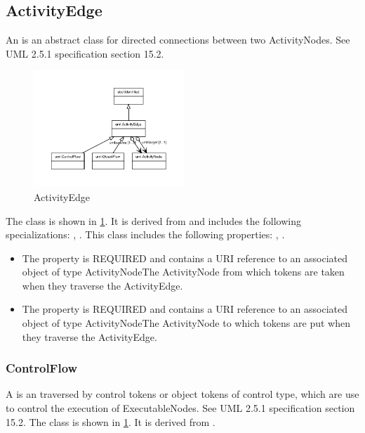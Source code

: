 \subsection{ActivityEdge}%
\label{sec:uml:ActivityEdge}%
An  is an abstract class for directed connections between two ActivityNodes. See UML 2.5.1 specification section 15.2.%
\newline%
\linebreak%


\begin{figure}[h!]%
\centering%
\includegraphics[width=0.5063829787234042\textwidth]{uml_classes/ActivityEdge_abstraction_hierarchy.pdf}%
\caption{ActivityEdge}%
\label{fig:ActivityEdge}%
\end{figure}

%
The  class is shown in \ref{fig:ActivityEdge}. It is derived from  and includes the following specializations: , . %
This class includes the following properties: , . %
\begin{itemize}%
\item%
The  property is REQUIRED and contains a URI reference to an associated object of type ActivityNodeThe ActivityNode from which tokens are taken when they traverse the ActivityEdge.%
\item%
The  property is REQUIRED and contains a URI reference to an associated object of type ActivityNodeThe ActivityNode to which tokens are put when they traverse the ActivityEdge.%
\end{itemize}%
\subsubsection{ControlFlow}%
\label{sec:uml:ControlFlow}%
A  is an  traversed by control tokens or object tokens of control type, which are use to control the execution of ExecutableNodes. See UML 2.5.1 specification section 15.2.%
\newline%
\linebreak%
The  class is shown in \ref{fig:ActivityEdge}. It is derived from .%
%
